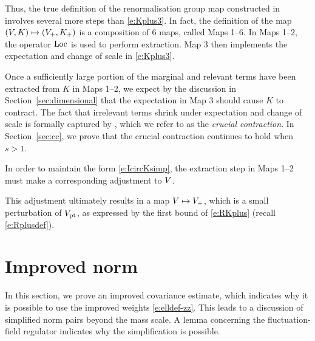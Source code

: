 Thus, the true definition of the renormalisation group map constructed in
\cite{BS-rg-step} involves several more steps than \eqref{e:Kplus3}. In fact,
the definition of the map $(V, K) \mapsto (V_+, K_+)$ is a composition of
$6$ maps, called Maps 1--6. In Maps 1--2, the operator $\operatorname{Loc}$ is used to perform
extraction. Map 3 then implements the expectation and change of scale in
\eqref{e:Kplus3}.

Once a sufficiently large portion of the marginal and relevant terms have been
extracted from $K$ in Maps 1--2, we expect by the discussion in Section~\ref{sec:dimensional}
that the expectation in Map 3 should cause $K$ to contract. The fact that irrelevant
terms shrink under expectation and change of scale is formally captured by
\cite[Proposition~\ref{IE-prop:cl}]{BS-rg-IE}, which we refer to as the
\emph{crucial contraction}. In Section~\ref{sec:cc}, we prove that the
crucial contraction continues to hold when $s > 1$.

\begin{rk}
In order to maintain the form \eqref{e:IcircKsimp}, the extraction step in Maps 1--2
must make a corresponding adjustment to $V$.

This adjustment ultimately results in a
map $V \mapsto V_+$, which is a small perturbation of $V_{\rm pt}$, as expressed
by the first bound of \eqref{e:RKplus} (recall \eqref{e:Rplusdef}).
\end{rk}


\section{Improved norm}
\label{sec:Rpf1}

In this section, we prove an improved covariance estimate, which indicates why
it is possible to use the improved weights \eqref{e:elldef-zz}. This leads to a
discussion of simplified norm pairs beyond the mass scale. A lemma concerning the
fluctuation-field regulator indicates why the simplification is possible.

